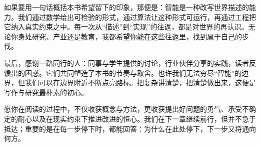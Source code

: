 如果要用一句话概括本书希望留下的印象，那便是：智能是一种改写世界描述的能力。我们通过数学给出可检验的形式，通过算法让这种形式可运行，再通过工程把它纳入真实约束之中。每一次从“描述”到“实现”的往返，都是对世界的再认识。无论你身处研究、产业还是教育，我都希望你能在这些往返里，找到属于自己的步伐。

最后，感谢一路同行的人：同事与学生提供的讨论，行业伙伴分享的实践，读者反馈出的困惑。它们共同塑造了本书的节奏与取舍。也许我们无法穷尽“智能”的边界，但我们可以在边界附近不断点亮路标。把复杂讲清楚，把清楚做出来，这便是写作与研究最朴素的初心。

愿你在阅读的过程中，不仅收获概念与方法，更收获提出好问题的勇气、承受不确定的耐心以及在现实约束下推进改进的恒心。我们在下一章继续前行，但并不急于抵达；重要的是在每一步停下时，都能回答：为什么在此处停下，下一步又将通向何方。
